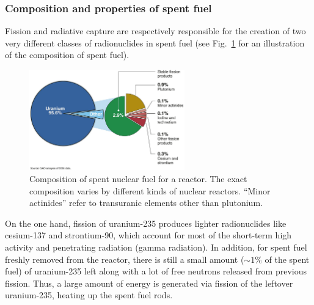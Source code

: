 \documentclass[nofootinbib,preprint,aps]{revtex4-1}
\begin{document}
        \subsubsection{Composition and properties of spent fuel}
        Fission and radiative capture are respectively responsible for the creation of two very
        different classes of radionuclides in spent fuel
        (see Fig.~\ref{fig:spentfuel} for an illustration of the composition of spent fuel).
        \begin{figure}
            \centering
            \includegraphics[width=0.6\textwidth]{spent-fuel.png}
            \caption{Composition of spent nuclear fuel for a reactor. The exact composition varies
            by different kinds of nuclear reactors. ``Minor actinides'' refer to transuranic elements other than plutonium.\cite{gao}}
            \label{fig:spentfuel}
        \end{figure}

        On the one hand, fission of uranium-235 produces lighter radionuclides like cesium-137 and strontium-90, which
        account for most of the short-term high activity and penetrating radiation (gamma radiation).
        In addition, for spent fuel freshly removed from the reactor, there is still a small amount ($\sim 1\%$ of
        the spent fuel)
        of uranium-235 left along with a lot of free neutrons released from previous fission. Thus, a large amount
        of energy is generated via fission of the leftover uranium-235, heating up the spent fuel rods.
\end{document}
